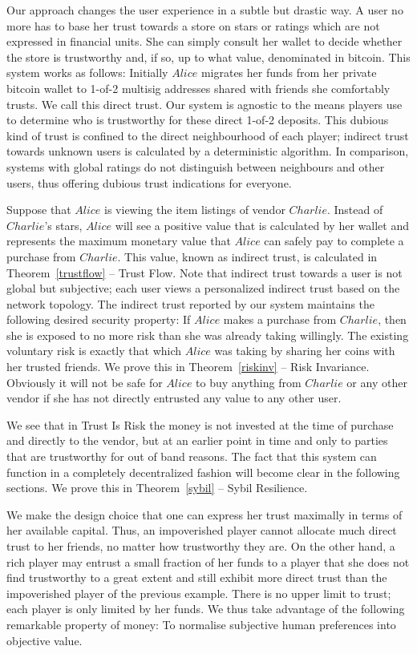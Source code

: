   Our approach changes the user experience in a subtle but drastic way. A user no more has to base her trust towards a
  store on stars or ratings which are not expressed in financial units. She can simply consult her wallet to decide whether
  the store is trustworthy and, if so, up to what value, denominated in bitcoin. This system works as follows: Initially
  $Alice$ migrates her funds from her private bitcoin wallet to 1-of-2 multisig addresses shared with friends she
  comfortably trusts. We call this direct trust. Our system is agnostic to the means players use to determine who is
  trustworthy for these direct 1-of-2 deposits. This dubious kind of trust is confined to the direct neighbourhood of each
  player; indirect trust towards unknown users is calculated by a deterministic algorithm. In comparison, systems with global
  ratings do not distinguish between neighbours and other users, thus offering dubious trust indications for everyone.

  Suppose that $Alice$ is viewing the item listings of vendor $Charlie$. Instead of $Charlie$'s stars, $Alice$ will see a
  positive value that is calculated by her wallet and represents the maximum monetary value that $Alice$ can safely pay to
  complete a purchase from $Charlie$. This value, known as indirect trust, is calculated in Theorem~\ref{trustflow} -- Trust
  Flow. Note that indirect trust towards a user is not global but subjective; each user views a personalized indirect trust
  based on the network topology. The indirect trust reported by our system maintains the following desired security property:
  If $Alice$ makes a purchase from $Charlie$, then she is exposed to no more risk than she was already taking willingly. The
  existing voluntary risk is exactly that which $Alice$ was taking by sharing her coins with her trusted friends. We prove
  this in Theorem~\ref{riskinv} -- Risk Invariance. Obviously it will not be safe for $Alice$ to buy anything from $Charlie$
  or any other vendor if she has not directly entrusted any value to any other user.

  We see that in Trust Is Risk the money is not invested at the time of purchase and directly to the vendor, but at an
  earlier point in time and only to parties that are trustworthy for out of band reasons. The fact that this system can
  function in a completely decentralized fashion will become clear in the following sections. We prove this in
  Theorem~\ref{sybil} -- Sybil Resilience.

  We make the design choice that one can express her trust maximally in terms of her available capital. Thus, an impoverished
  player cannot allocate much direct trust to her friends, no matter how trustworthy they are. On the other hand, a rich
  player may entrust a small fraction of her funds to a player that she does not find trustworthy to a great extent and still
  exhibit more direct trust than the impoverished player of the previous example. There is no upper limit to trust; each
  player is only limited by her funds. We thus take advantage of the following remarkable property of money: To normalise
  subjective human preferences into objective value.

